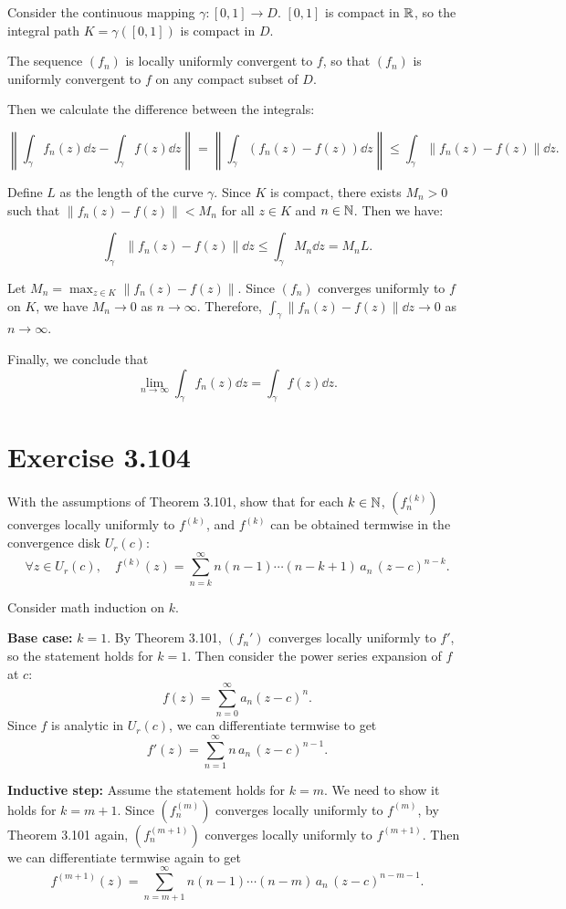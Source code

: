 \documentclass{article}
\begin{document}
\begin{solution}
  Consider the continuous mapping $\gamma: [0,1] \to D$. $[0,1]$ is
  compact in $\mathbb{R}$, so the integral path $K = \gamma([0,1])$ is compact in $D$.

  The sequence $(f_n)$ is locally uniformly convergent to $f$, so
  that $(f_n)$ is uniformly convergent to $f$ on any compact subset of $D$.

  Then we calculate the difference between the integrals:

  \[
    \left\|\int_\gamma f_n(z) \dd z - \int_\gamma f(z) \dd z\right\|
    = \left\|\int_\gamma (f_n(z) - f(z)) \dd z\right\| \leq
    \int_\gamma \|f_n(z) - f(z)\| \dd z.
  \]

  Define $L$ as the length of the curve $\gamma$. Since $K$ is
  compact, there exists $M_n > 0$ such that $\|f_n(z) - f(z)\| < M_n$ for
  all $z \in K$ and $n \in \mathbb{N}$. Then we have:

  \[
    \int_\gamma \|f_n(z) - f(z)\| \dd z
    \leq \int_\gamma M_n \dd z = M_n L.
  \]

  Let $M_n = \max_{z \in K} \|f_n(z) - f(z)\|$. Since $(f_n)$
  converges uniformly to $f$ on $K$, we have $M_n \to 0$ as $n \to
  \infty$. Therefore, $\int_\gamma \|f_n(z) - f(z)\| \dd z \to 0$ as
  $n \to \infty$.

  Finally, we conclude that
  \[
    \lim_{n\to\infty} \int_\gamma f_n(z)\dd z
    = \int_\gamma f(z)\dd z.
  \]

\end{solution}

\section{Exercise 3.104}

With the assumptions of Theorem 3.101, show that
for each $k \in \mathbb{N}$,
$(f_n^{(k)})$ converges locally uniformly to $f^{(k)}$,
and $f^{(k)}$ can be obtained termwise in the
convergence disk $U_r(c)$:
\[
  \forall z \in U_r(c),\quad
  f^{(k)}(z)
  = \sum_{n=k}^{\infty} n(n-1)\cdots(n-k+1)\,a_n\,(z-c)^{n-k}.
\]

\begin{solution}
  Consider math induction on $k$.

  \textbf{Base case:} $k = 1$.
  By Theorem 3.101, $(f_n')$ converges locally uniformly to $f'$, so
  the statement holds for $k = 1$.
  Then consider the power series expansion of $f$ at $c$:
  \[
    f(z) = \sum_{n=0}^{\infty} a_n (z-c)^n.
  \]
  Since $f$ is analytic in $U_r(c)$, we can differentiate termwise
  to get
  \[
    f'(z) = \sum_{n=1}^{\infty} n\,a_n\,(z-c)^{n-1}.
  \]

  \textbf{Inductive step:} Assume the statement holds for $k = m$.
  We need to show it holds for $k = m + 1$.
  Since $(f_n^{(m)})$ converges locally uniformly to $f^{(m)}$, by
  Theorem 3.101 again, $(f_n^{(m+1)})$ converges locally uniformly to
  $f^{(m+1)}$.
  Then we can differentiate termwise again to get
  \[
    f^{(m+1)}(z) = \sum_{n=m+1}^{\infty} n(n-1)\cdots(n-m)\,a_n\,(z-c)^{n-m-1}.
  \]


\end{solution}
\end{document}
